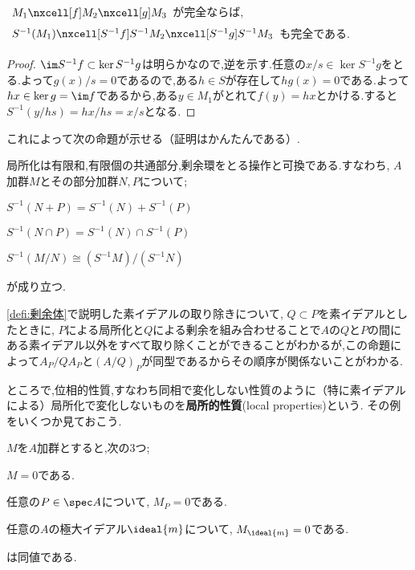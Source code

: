 \begin{prop}\label{prop:局所化は完全関手}
	$\begin{tikzcd}
	M_1\nxcell[f]M_2\nxcell[g]M_3
	\end{tikzcd}$が完全ならば, $\begin{tikzcd}
	S^{-1}(M_1)\nxcell[S^{-1}f]S^{-1}M_2\nxcell[S^{-1}g]S^{-1}M_3
	\end{tikzcd}$も完全である.
\end{prop}
\begin{proof}
	$\im S^{-1}f\subset\ker S^{-1}g$は明らかなので,逆を示す.任意の$x/s\in\ker S^{-1}g$をとる.よって$g(x)/s=0$であるので,ある$h\in S$が存在して$hg(x)=0$である.よって$hx\in\ker g=\im f$であるから,ある$y\in M_1$がとれて$f(y)=hx$とかける.すると$S^{-1}(y/hs)=hx/hs=x/s$となる.
\end{proof}

これによって次の命題が示せる（証明はかんたんである）.
\begin{prop}\label{prop:局所化はいろんな操作と可換}
	局所化は有限和,有限個の共通部分,剰余環をとる操作と可換である.すなわち, $A$加群$M$とその部分加群$N,P$について;
	\begin{sakura}
		\item $S^{-1}(N+P)=S^{-1}(N)+S^{-1}(P)$
		\item $S^{-1}(N\cap P)=S^{-1}(N)\cap S^{-1}(P)$
		\item $S^{-1}(M/N)\cong (S^{-1}M)/(S^{-1}N)$
	\end{sakura}
	が成り立つ.
\end{prop}

\ref{defi:剰余体}で説明した素イデアルの取り除きについて, $Q\subset P$を素イデアルとしたときに, $P$による局所化と$Q$による剰余を組み合わせることで$A$の$Q$と$P$の間にある素イデアル以外をすべて取り除くことができることがわかるが,この命題によって$A_P/QA_P$と$(A/Q)_P$が同型であるからその順序が関係ないことがわかる.

ところで,位相的性質,すなわち同相で変化しない性質のように（特に素イデアルによる）局所化で変化しないものを\textbf{局所的性質}(local properties)という. その例をいくつか見ておこう.

\begin{prop}\label{prop:局所化したら0は局所的}
	$M$を$A$加群とすると,次の3つ;
	\begin{sakura}
		\item $M=0$である.
		\item 任意の$P\in \spec A$について, $M_P=0$である.
		\item 任意の$A$の極大イデアル$\ideal{m}$について, $M_{\ideal{m}}=0$である.
	\end{sakura}
	は同値である.
\end{prop}

